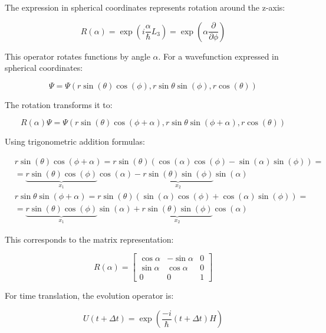 The expression in spherical coordinates represents rotation around the z-axis:

\begin{equation}
R(\alpha)=\exp \left(i \frac{\alpha}{\hbar} L_{3}\right)=\exp \left(\alpha \frac{\partial}{\partial \phi}\right)
\end{equation}

This operator rotates functions by angle $\alpha$. For a wavefunction expressed in spherical coordinates:

\begin{equation}
\Psi=\Psi(r \sin (\theta) \cos (\phi), r \sin \theta \sin (\phi), r \cos (\theta))
\end{equation}

The rotation transforms it to:

\begin{equation}
R(\alpha) \Psi=\Psi(r \sin (\theta) \cos (\phi+\alpha), r \sin \theta \sin (\phi+\alpha), r \cos (\theta))
\end{equation}

Using trigonometric addition formulas:

\begin{align}
& r \sin (\theta) \cos (\phi+\alpha)=r \sin (\theta)(\cos (\alpha) \cos (\phi)-\sin (\alpha) \sin (\phi))= \\
& =\underbrace{r \sin (\theta) \cos (\phi)}_{x_{1}} \cos (\alpha)-\underbrace{r \sin (\theta) \sin (\phi)}_{x_{2}} \sin (\alpha)  \\
& r \sin \theta \sin (\phi+\alpha)=r \sin (\theta)(\sin (\alpha) \cos (\phi)+\cos (\alpha) \sin (\phi))= \\
& =\underbrace{r \sin (\theta) \cos (\phi)}_{x_{1}} \sin (\alpha)+\underbrace{r \sin (\theta) \sin (\phi)}_{x_{2}} \cos (\alpha)
\end{align}

This corresponds to the matrix representation:

\[
R(\alpha)=\left[\begin{array}{ccc}
\cos \alpha & -\sin \alpha & 0  \\
\sin \alpha & \cos \alpha & 0 \\
0 & 0 & 1
\end{array}\right]
\]

For time translation, the evolution operator is:

\begin{equation}
U(t+\Delta t)=\exp \left(\frac{-i}{\hbar}(t+\Delta t) H\right)
\end{equation}

